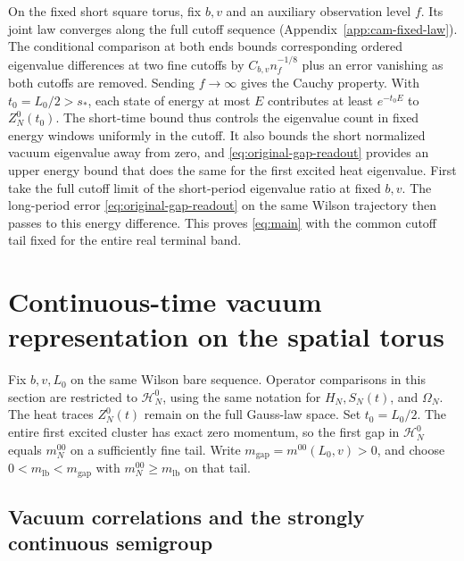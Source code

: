 \documentclass[11pt,a4paper]{article}
\numberwithin{equation}{section}
\begin{document}
On the fixed short square torus, fix \(b,v\) and an auxiliary observation level \(f\). Its joint law converges along the full cutoff sequence (Appendix~\ref{app:cam-fixed-law}). The conditional comparison at both ends bounds corresponding ordered eigenvalue differences at two fine cutoffs by \(C_{b,v}n_f^{-1/8}\) plus an error vanishing as both cutoffs are removed. Sending \(f\to\infty\) gives the Cauchy property. With \(t_0=L_0/2>s_*\), each state of energy at most \(E\) contributes at least \(e^{-t_0E}\) to \(Z_N^0(t_0)\). The short-time bound thus controls the eigenvalue count in fixed energy windows uniformly in the cutoff. It also bounds the short normalized vacuum eigenvalue away from zero, and \eqref{eq:original-gap-readout} provides an upper energy bound that does the same for the first excited heat eigenvalue. First take the full cutoff limit of the short-period eigenvalue ratio at fixed \(b,v\). The long-period error \eqref{eq:original-gap-readout} on the same Wilson trajectory then passes to this energy difference. This proves \eqref{eq:main} with the common cutoff tail fixed for the entire real terminal band.

\section{Continuous-time vacuum representation on the spatial torus}
\label{sec:vacuum-reports}

Fix \(b,v,L_0\) on the same Wilson bare sequence. Operator comparisons in this section are restricted to \(\mathcal H_N^0\), using the same notation for \(H_N,S_N(t)\), and \(\Omega_N\). The heat traces \(Z_N^0(t)\) remain on the full Gauss-law space. Set \(t_0=L_0/2\). The entire first excited cluster has exact zero momentum, so the first gap in \(\mathcal H_N^0\) equals \(m_N^{00}\) on a sufficiently fine tail. Write \(m_{\mathrm{gap}}=m^{00}(L_0,v)>0\), and choose \(0<m_{\mathrm{lb}}<m_{\mathrm{gap}}\) with \(m_N^{00}\ge m_{\mathrm{lb}}\) on that tail.

\subsection{Vacuum correlations and the strongly continuous semigroup}
\end{document}
